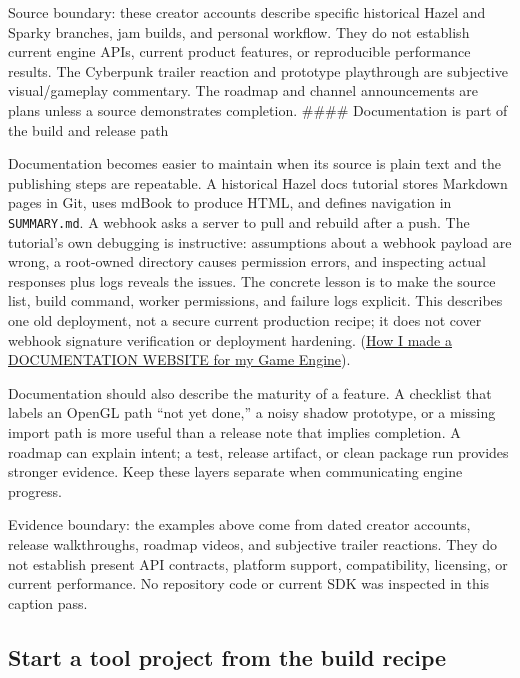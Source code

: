Source boundary: these creator accounts describe specific historical Hazel and Sparky branches, jam builds, and personal workflow. They do not establish current engine APIs, current product features, or reproducible performance results. The Cyberpunk trailer reaction and prototype playthrough are subjective visual/gameplay commentary. The roadmap and channel announcements are plans unless a source demonstrates completion. \#\#\#\# Documentation is part of the build and release path

Documentation becomes easier to maintain when its source is plain text and the publishing steps are repeatable. A historical Hazel docs tutorial stores Markdown pages in Git, uses mdBook to produce HTML, and defines navigation in \texttt{SUMMARY.md}. A webhook asks a server to pull and rebuild after a push. The tutorial's own debugging is instructive: assumptions about a webhook payload are wrong, a root-owned directory causes permission errors, and inspecting actual responses plus logs reveals the issues. The concrete lesson is to make the source list, build command, worker permissions, and failure logs explicit. This describes one old deployment, not a secure current production recipe; it does not cover webhook signature verification or deployment hardening. (\href{https://www.youtube.com/watch?v=tJDof3nrfHU&t=3m18s}{How I made a DOCUMENTATION WEBSITE for my Game Engine}).

Documentation should also describe the maturity of a feature. A checklist that labels an OpenGL path ``not yet done,'' a noisy shadow prototype, or a missing import path is more useful than a release note that implies completion. A roadmap can explain intent; a test, release artifact, or clean package run provides stronger evidence. Keep these layers separate when communicating engine progress.

Evidence boundary: the examples above come from dated creator accounts, release walkthroughs, roadmap videos, and subjective trailer reactions. They do not establish present API contracts, platform support, compatibility, licensing, or current performance. No repository code or current SDK was inspected in this caption pass.

\subsection{Start a tool project from the build recipe}\label{05-engine-i-ch013-start-a-tool-project-from-the-build-recipe}

